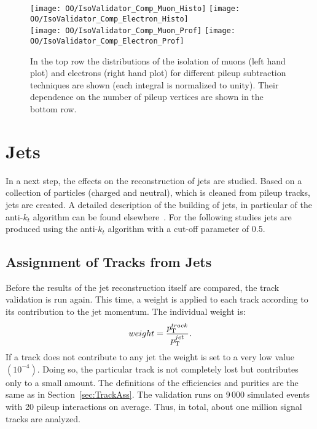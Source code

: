 \begin{figure}[h!t]
  \centering
  \texttt{[image: OO/IsoValidator\_Comp\_Muon\_Histo]}
  \texttt{[image: OO/IsoValidator\_Comp\_Electron\_Histo]}
  \\
  \texttt{[image: OO/IsoValidator\_Comp\_Muon\_Prof]}
  \texttt{[image: OO/IsoValidator\_Comp\_Electron\_Prof]}
  \caption[Distributions of the isolation of muons and electrons and their dependencies on the number of pileup vertices for different pileup subtraction techniques]{In the top row the distributions of the isolation of muons (left hand plot) and electrons (right hand plot) for different pileup subtraction techniques are shown (each integral is normalized to unity). Their dependence on the number of pileup vertices are shown in the bottom row. \label{plot:OOIsoComp}}
\end{figure}



\section{Jets \label{sec:OOJets}}

In a next step, the effects on the reconstruction of jets are studied. Based on a collection of particles (charged and neutral), which is cleaned from pileup tracks, jets are created. A detailed description of the building of jets, in particular of the anti-$k_{t}$ algorithm can be found elsewhere~\cite{Cacciari:2008gp}. For the following studies jets are produced using the anti-$k_{t}$ algorithm with a cut-off parameter of 0.5.

\subsection{Assignment of Tracks from Jets \label{sec:OOJetsTracks}}

Before the results of the jet reconstruction itself are compared, the track validation is run again. This time, a weight is applied to each track according to its contribution to the jet momentum. The individual weight is:
\begin{equation}
weight = \frac{ p_{\mathrm{T}}^{track} }{ p_{\mathrm{T}}^{jet} }.
\label{eq:OOJetWeight}
\end{equation}
If a track does not contribute to any jet the weight is set to a very low value $\left(10^{-4}\right)$. Doing so, the particular track is not completely lost but contributes only to a small amount. The definitions of the efficiencies and purities are the same as in Section~\ref{sec:TrackAss}. The validation runs on 9\,000 simulated \ttbar events with 20 pileup interactions on average. Thus, in total, about one million signal tracks are analyzed.

